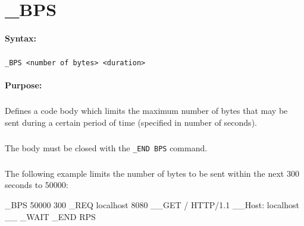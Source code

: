 
\newpage
\section{\_BPS}
\label{cmd:_BPS}

\paragraph{Syntax:}
\subparagraph{}
\texttt{\_BPS <number of bytes> <duration>}

\paragraph{Purpose:}
\subparagraph{}
Defines a code body which limits the maximum number of bytes  
that may be sent during a certain period of time (specified in number of seconds). 

\subparagraph{}
The body must be closed with the \texttt{\_END BPS} command.

\subparagraph{}
The following example limits the number of bytes to be sent within 
the next 300 seconds to 50000:

\begin{usplisting}
    _BPS 50000 300
    _REQ localhost 8080
    __GET / HTTP/1.1
    __Host: localhost
    __
    _WAIT
    _END RPS
\end{usplisting}
